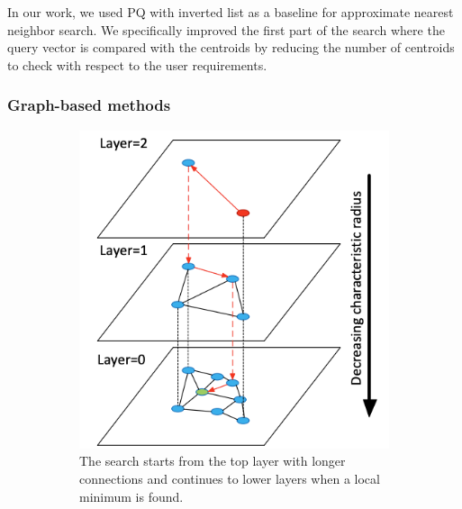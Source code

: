 In our work, we used PQ with inverted list as a baseline for approximate nearest neighbor search. 
We specifically improved the first part of the search where the query vector is compared with the centroids by reducing the number of centroids to check with respect to the user requirements. 

\subsubsection*{Graph-based methods}

\begin{figure}
    \centering
    \begin{subfigure}[b]{0.4\textwidth}
        \includegraphics[width=\textwidth]{thesis/images/hnsw-fig.png}
        \caption{The search starts from the top layer with longer connections and continues to lower layers when a local minimum is found.}
        \label{fig:hnsw1}
    \end{subfigure}
    \begin{subfigure}[b]{0.45\textwidth}

\end{subfigure}
\end{figure}
